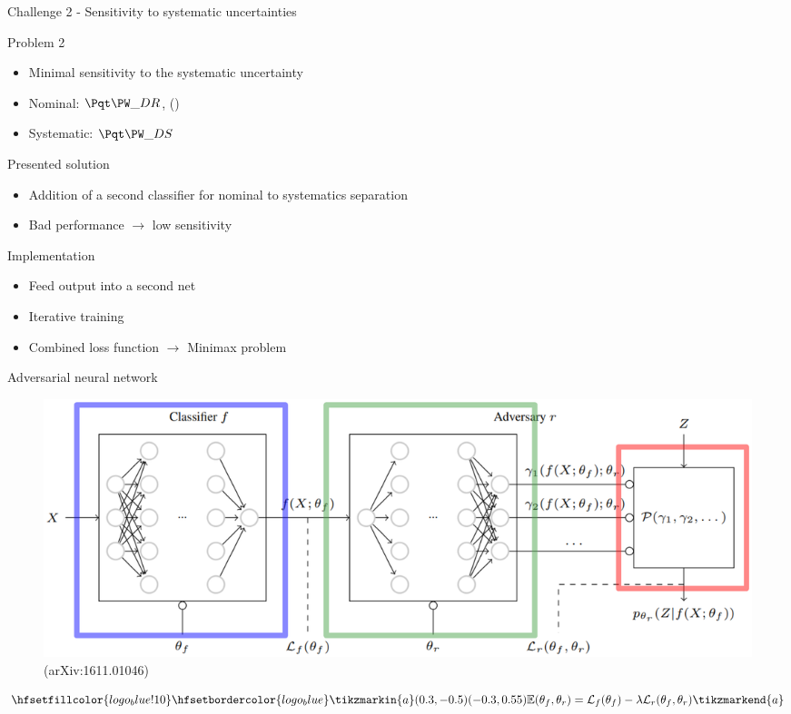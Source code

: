 \begin{frame}{Challenge 2 - Sensitivity to systematic uncertainties}
\begin{block}{Problem 2}
    \begin{itemize}
        \item Minimal sensitivity to the systematic uncertainty
        \item Nominal: $\tW\_DR$, (\ttbar)
        \item Systematic: $\tW\_DS$
    \end{itemize}
\end{block}
\begin{block}{Presented solution}
   \begin{itemize}
       \item Addition of a second classifier for nominal to systematics separation
       \item Bad performance $\longrightarrow$ low sensitivity
   \end{itemize}
\end{block}
\begin{block}{Implementation}
    \begin{itemize}
        \item Feed output into a second net
        \item Iterative training
        \item Combined loss function $\longrightarrow$ Minimax problem
    \end{itemize}
\end{block}
\end{frame}

\begin{frame}{Adversarial neural network}
\vspace{-0.3cm}
    \begin{figure}
        \centering
        \includegraphics[width=\textwidth]{figures_theory/ANN_paper.eps}
        \caption{(arXiv:1611.01046)}
    \end{figure}
    \begin{equation*}
        \hfsetfillcolor{logo_blue!10}
        \hfsetbordercolor{logo_blue}
        \tikzmarkin{a}(0.3,-0.5)(-0.3,0.55)
        \mathbb{E}(\theta_f, \theta_r) = \mathcal{L}_f(\theta_f) - \lambda \mathcal{L}_r(\theta_f, \theta_r)
        \tikzmarkend{a}
    \end{equation*}
\end{frame}

